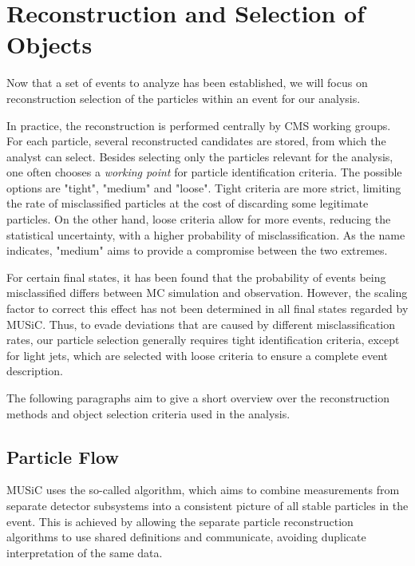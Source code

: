 \section{Reconstruction and Selection of Objects}
\label{sec:reconstruction}

Now that a set of events to analyze has been established, we will focus on reconstruction selection of the particles within an event for our analysis. 

In practice, the reconstruction is performed centrally by \ac{CMS} working groups. For each particle, several reconstructed candidates are stored, from which the analyst can select. 
Besides selecting only the particles relevant for the analysis, one often chooses a \emph{working point} for particle identification criteria. The possible options are "tight", "medium" and "loose". Tight criteria are more strict, limiting the rate of misclassified particles at the cost of discarding some legitimate particles. On the other hand, loose criteria allow for more events, reducing the statistical uncertainty, with a higher probability of misclassification. As the name indicates, "medium" aims to provide a compromise between the two extremes.

For certain final states, it has been found that the probability of events being misclassified differs between \ac{MC} simulation and observation. However, the scaling factor to correct this effect has not been determined in all final states regarded by \ac{MUSiC}. Thus, to evade deviations that are caused by different misclassification rates, our particle selection generally requires tight identification criteria, except for light jets, which are selected with loose criteria to ensure a complete event description.

The following paragraphs aim to give a short overview over the reconstruction methods and object selection criteria used in the analysis. 

\subsection{Particle Flow}
\ac{MUSiC} uses the so-called  algorithm\cite{CMS:CMS-PAS-PFT-09-001}, which aims to combine measurements from separate detector subsystems into a consistent picture of all stable particles in the event. This is achieved by allowing the separate particle reconstruction algorithms to use shared definitions and communicate, avoiding duplicate interpretation of the same data.

